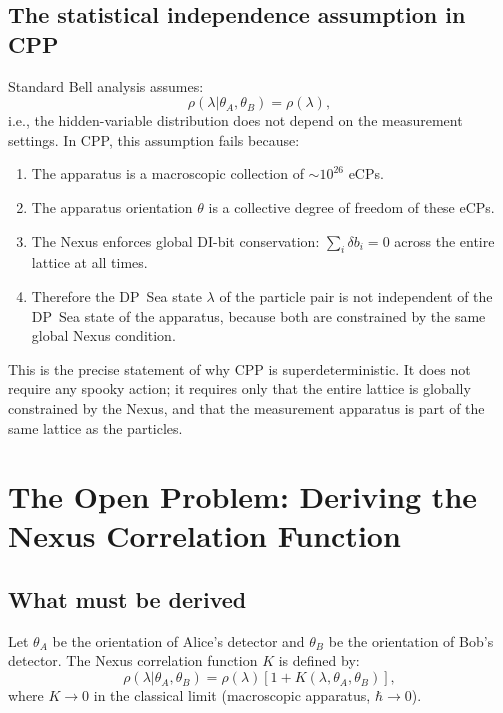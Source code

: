 \documentclass[11pt,a4paper]{article}
\begin{document}
\subsection{The statistical independence assumption in CPP}

Standard Bell analysis assumes:
\begin{equation}
\rho(\lambda | \theta_A, \theta_B) = \rho(\lambda),
\label{eq:stat_indep}
\end{equation}
i.e., the hidden-variable distribution does not depend on the
measurement settings.  In CPP, this assumption fails because:

\begin{enumerate}
\item The apparatus is a macroscopic collection of $\sim 10^{26}$ eCPs.
\item The apparatus orientation $\theta$ is a collective degree of
  freedom of these eCPs.
\item The Nexus enforces global DI-bit conservation:
  $\sum_{i} \delta b_i = 0$ across the entire lattice at all times.
\item Therefore the DP~Sea state $\lambda$ of the particle pair is
  not independent of the DP~Sea state of the apparatus, because both
  are constrained by the same global Nexus condition.
\end{enumerate}

This is the precise statement of why CPP is superdeterministic.  It
does not require any spooky action; it requires only that the entire
lattice is globally constrained by the Nexus, and that the
measurement apparatus is part of the same lattice as the particles.

\section{The Open Problem: Deriving the Nexus Correlation Function}
\label{sec:openprob}

\subsection{What must be derived}

Let $\theta_A$ be the orientation of Alice's detector and $\theta_B$
be the orientation of Bob's detector.  The Nexus correlation function
$K$ is defined by:
\begin{equation}
\rho(\lambda | \theta_A, \theta_B)
= \rho(\lambda)\left[1 + K(\lambda, \theta_A, \theta_B)\right],
\label{eq:nexus_corr}
\end{equation}
where $K \to 0$ in the classical limit (macroscopic apparatus,
$\hbar \to 0$).
\end{document}
